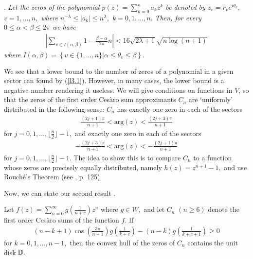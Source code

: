\documentclass[final]{siamltex}
\begin{document}
\vspace {4 pt}


.  {\em Let the zeros of the polynomial $p(z) = \sum_{k=0}^{n} a_{k} z^{k}$ be denoted by $z_{v} = r_{v}e^{i \theta_{v}},$ $v = 1, \ldots, n,$ where $n^{-\lambda} \leq |a_{k} | \leq n^{\lambda},$ $k = 0,1, \ldots, n.$ Then, for every $0 \leq \alpha < \beta \leq 2 \pi$ we have
  \begin{eqnarray} 
\label{l3.1}
\left| \sum_{v \in I( \alpha, \beta)} 1 - \frac{ \beta - \alpha}{2 \pi} n \right| < 16 \sqrt{2 \lambda +1} \sqrt{n \log(n+1) }
  \end{eqnarray} 
  where $I(\alpha, \beta) = \left\{ v \in \{1, \ldots, n\} | \alpha \leq \theta_{v} \leq \beta \right\}.$  }

  We see that a lower bound to the number of zeros of a polynomial in a given sector can found by (\ref{l3.1}). However, in many cases, the lower bound is a negative number rendering it useless.  We will give conditions on functions in $V$, so that the zeros of the first order Ces\`{a}ro sum approximants $C_n$ are `uniformly' distributed in the following sense: $C_{n}$ has exactly one zero in each of the sectors
  \begin{eqnarray*} \frac{ (2j+1) \pi}{n+1} < \mbox{arg}(z) < \frac{(2j+3) \pi}{n+1} 
  \end{eqnarray*}
  for $j = 0, 1, \ldots, \lfloor \frac{n}{2} \rfloor -1,$  and exactly one zero in each of the sectors 
  \begin{eqnarray*} -\frac{ (2j+3) \pi}{n+1} < \mbox{arg}(z) < -\frac{(2j+1) \pi}{n+1} 
  \end{eqnarray*}
  for $j = 0, 1, \ldots, \lfloor \frac{n}{2} \rfloor -1.$ The idea to show this is to compare $C_{n}$ to a function whose zeros are precisely equally distributed, namely $h(z) = z^{n+1} -1,$ and use Rouch\'{e}'s Theorem (see \cite{con}, p. 125).  

  Now, we can state our second result . 

 \begin{theorem} 
\label{Theorem2}
Let $f(z) = \sum_{n=0}^{\infty} g \left( \frac{1}{n+c} \right) z^{n}$ where $g \in W,$ and let $C_{n}$ $(n \geq 6)$ denote the first order Ces\`{a}ro sums of the function $f.$  If
 \begin{eqnarray*}
  (n-k+1)\cos \left( \frac{3\pi}{n+1} \right) g \left( \frac{1}{k+c} \right) - (n-k)g \left( \frac{1}{k+c+1} \right) \geq 0
 \end{eqnarray*} for $k = 0,1, \ldots, n-1,$ then the convex hull of the zeros of $C_{n}$ contains the unit disk $\Bbb D.$ 
\end{theorem}
\end{document}
